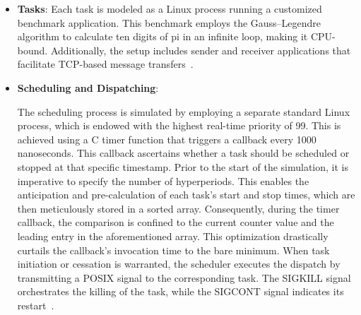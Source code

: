    \begin{itemize}
    \item \textbf{Tasks}: Each task is modeled as a Linux process running a customized benchmark application. This benchmark employs the Gauss–Legendre algorithm to calculate ten digits of pi in an infinite loop, making it CPU-bound. Additionally, the setup includes sender and receiver applications that facilitate TCP-based message transfers~\cite{askaripoor2023designer}.
    
    \item \textbf{Scheduling and Dispatching}: 
    
    The scheduling process is simulated by employing a separate standard Linux process, which is endowed with the highest real-time priority of 99. This is achieved using a C timer function that triggers a callback every 1000 nanoseconds. This callback ascertains whether a task should be scheduled or stopped at that specific timestamp.
    Prior to the start of the simulation, it is imperative to specify the number of hyperperiods. This enables the anticipation and pre-calculation of each task's start and stop times, which are then meticulously stored in a sorted array. Consequently, during the timer callback, the comparison is confined to the current counter value and the leading entry in the aforementioned array. This optimization drastically curtails the callback's invocation time to the bare minimum.
    When task initiation or cessation is warranted, the scheduler executes the dispatch by transmitting a POSIX signal to the corresponding task. The SIGKILL signal orchestrates the killing of the task, while the SIGCONT signal indicates its restart~\cite{askaripoor2023designer}.
    
    
       
  
    



\end{itemize}
